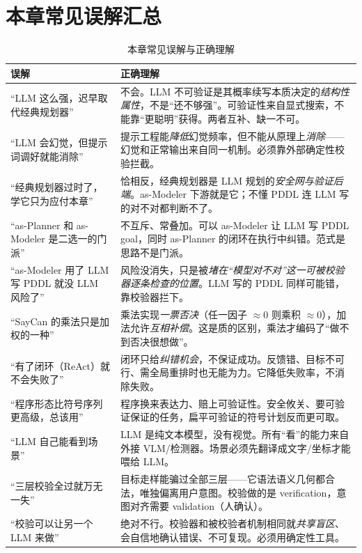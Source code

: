 \section{本章常见误解汇总}
\label{sec:llm-misconceptions}

\begin{table}[H]\centering\small
\caption{本章常见误解与正确理解}
\label{tab:misconceptions}
\begin{tabular}{p{4.0cm}p{8.2cm}}
\toprule
误解 & 正确理解 \\
\midrule
“LLM 这么强，迟早取代经典规划器” & 不会。LLM 不可验证是其概率续写本质决定的\emph{结构性属性}，不是“还不够强”。可验证性来自显式搜索，不能靠“更聪明”获得。两者互补、缺一不可。 \\
“LLM 会幻觉，但提示词调好就能消除” & 提示工程能\emph{降低}幻觉频率，但不能从原理上\emph{消除}——幻觉和正常输出来自同一机制。必须靠外部确定性校验拦截。 \\
“经典规划器过时了，学它只为应付本章” & 恰相反，经典规划器是 LLM 规划的\emph{安全网与验证后端}。as-Modeler 下游就是它；不懂 PDDL 连 LLM 写的对不对都判断不了。 \\
“as-Planner 和 as-Modeler 是二选一的门派” & 不互斥、常叠加。可以 as-Modeler 让 LLM 写 PDDL goal，同时 as-Planner 的闭环在执行中纠错。范式是思路不是门派。 \\
“as-Modeler 用了 LLM 写 PDDL 就没 LLM 风险了” & 风险没消失，只是被\emph{堵在“模型对不对”这一可被校验器逐条检查的位置}。LLM 写的 PDDL 同样可能错，靠校验器拦下。 \\
“SayCan 的乘法只是加权的一种” & 乘法实现\emph{一票否决}（任一因子 $\approx 0$ 则乘积 $\approx 0$），加法允许\emph{互相补偿}。这是质的区别，乘法才编码了“做不到否决很想做”。 \\
“有了闭环（ReAct）就不会失败了” & 闭环只给\emph{纠错机会}，不保证成功。反馈错、目标不可行、需全局重排时也无能为力。它降低失败率，不消除失败。 \\
“程序形态比符号序列更高级，总该用” & 程序换来表达力、赔上可验证性。安全攸关、要可验证保证的任务，扁平可验证的符号计划反而更可取。 \\
“LLM 自己能看到场景” & LLM 是纯文本模型，没有视觉。所有“看”的能力来自外接 VLM/检测器。场景必须先翻译成文字/坐标才能喂给 LLM。 \\
“三层校验全过就万无一失” & 目标走样能骗过全部三层——它语法语义几何都合法，唯独偏离用户意图。校验做的是 verification，意图对齐需要 validation（人确认）。 \\
“校验可以让另一个 LLM 来做” & 绝对不行。校验器和被校验者机制相同就\emph{共享盲区}、会自信地确认错误、不可复现。必须用确定性工具。 \\

\end{tabular}
\end{table}
